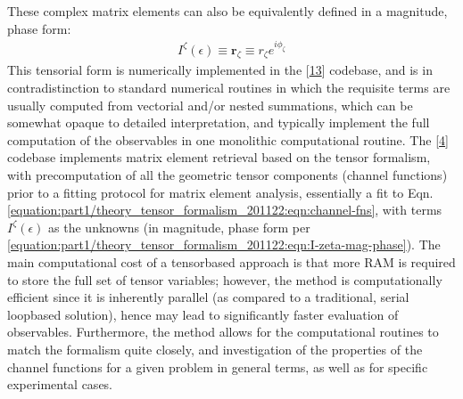 \documentclass[letterpaper,table,10pt,english]{jupyterBook}
\begin{document}
\sphinxAtStartPar
These complex matrix elements can also be equivalently defined in a magnitude, phase
form:
\begin{equation}\label{equation:part1/theory_tensor_formalism_201122:eqn:I-zeta-mag-phase}
\begin{split}I^{\zeta}(\epsilon)\equiv\mathbf{r}_{\zeta}\equiv r_{\zeta}e^{i\phi_{\zeta}}\end{split}
\end{equation}
\sphinxAtStartPar
This tensorial form is numerically implemented in the  {[}\hyperlink{cite.backmatter/bibliography:id508}{13}{]} codebase, and is in contradistinction to standard numerical routines in which the requisite terms are usually computed from vectorial and/or nested summations, which can be somewhat opaque to
detailed interpretation, and typically implement the full computation of the observables in one monolithic computational routine. The  {[}\hyperlink{cite.backmatter/bibliography:id574}{4}{]} codebase implements matrix element retrieval based on the tensor formalism, with pre\sphinxhyphen{}computation of all the geometric tensor components (channel functions) prior to a fitting protocol for matrix element analysis, essentially a fit to Eqn. \eqref{equation:part1/theory_tensor_formalism_201122:eqn:channel-fns}, with terms \(I^{\zeta}(\epsilon)\) as the unknowns (in magnitude, phase form per \eqref{equation:part1/theory_tensor_formalism_201122:eqn:I-zeta-mag-phase}). The main computational cost of a tensor\sphinxhyphen{}based approach is that more RAM is required to store the full set of tensor variables; however, the method is computationally efficient since it is inherently parallel (as compared to a traditional, serial loop\sphinxhyphen{}based solution), hence may lead to significantly faster evaluation of observables. Furthermore, the method allows for the computational routines to match the formalism quite closely, and investigation of the properties of the channel functions for a given problem in general terms, as well as for specific experimental cases.
\end{document}
